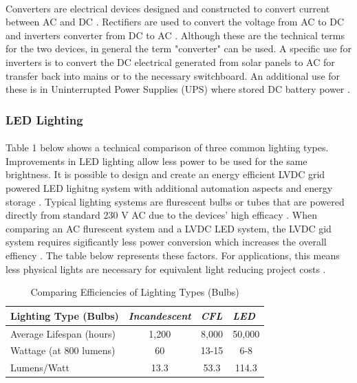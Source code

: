 \paragraph{}
Converters are electrical devices designed and constructed to convert current between AC and DC \cite{website:ConvVsInverter}. Rectifiers are used to convert the voltage from AC to DC and inverters converter from DC to AC \cite{website:ConvVsInverter}. Although these are the technical terms for the two devices, in general the term "converter" can be used. A specific use for inverters is to convert the DC electrical generated from solar panels to AC for transfer back into mains or to the necessary switchboard. An additional use for these is in Uninterrupted Power Supplies (UPS) where stored DC battery power \cite{website:ConvVsInverter}.

\newpage

\subsubsection{LED Lighting}

\paragraph{}
Table 1 below shows a technical comparison of three common lighting types. Improvements in LED lighting allow less power to be used for the same brightness. It is possible to design and create an energy efficient LVDC grid powered LED lighitng system with additional automation aspects and energy storage \cite{Koh2011}. Typical lighting systems are flurescent bulbs or tubes that are powered directly from standard 230 V AC due to the devices' high efficacy \cite{Koh2011}. When comparing an AC flurescent system and a LVDC LED system, the LVDC gid system requires sigificantly less power conversion which increases the overall effiency \cite{Koh2011}. The table below represents these factors. For applications, this means less physical lights are necessary for equivalent light reducing project costs \cite{website:LED}.  

\begin{table}[!ht]
\centering
\renewcommand{\arraystretch}{2} %
\begin{tabular}{|l|c|c|c|}
\hline
\textbf{Lighting Type (Bulbs)} & \multicolumn{1}{l|}{\textit{Incandescent}} & \multicolumn{1}{l|}{\textit{CFL}} & \multicolumn{1}{l|}{\textit{LED}} \\ \hline
Average Lifespan (hours) & 1,200 & 8,000 & 50,000 \\ \hline
Wattage (at 800 lumens) & 60 & 13-15 & 6-8 \\ \hline
Lumens/Watt & 13.3 & 53.3 & 114.3 \\ \hline
\end{tabular} \quad
\caption{Comparing Efficiencies of Lighting Types (Bulbs) \cite{Koh2011}}
\label{LightingTypes}
\end{table}


